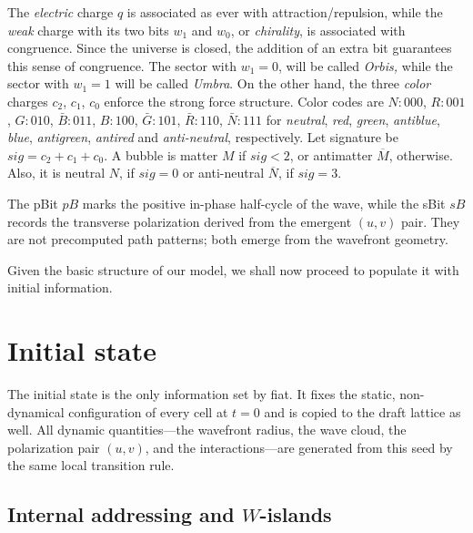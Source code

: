 \documentclass{ijuc}
\begin{document}
The \emph{electric} charge $q$ is associated as ever with attraction/repulsion, while the \emph{weak} charge with its two bits $w_{1}$ and $w_{0}$, or \emph{chirality}, is associated with congruence.
Since the universe is closed, the addition of an extra bit guarantees this sense of congruence. 
The sector with $w_{1}=0$, will be called \emph{Orbis, }while the sector with $w_{1}=1$ will be called \emph{Umbra}. 
On the other hand, the three \emph{color} charges $c_{2}$, $c_{1}$, $c_{0}$ enforce the strong force structure. 
Color codes are $N:000$, $R:001$, $G:010$, $\bar{B}:011$, $B:100$, $\bar{G}:101$, $\bar{R}:110$, $\bar{N}:111$ for \emph{neutral}, \emph{red}, \emph{green}, \emph{antiblue}, \emph{blue}, \emph{antigreen}, \emph{antired} and \emph{anti-neutral}, respectively.
Let signature be $sig=c_{2}+c_{1}+c_{0}$. 
A bubble is matter $M$ if $sig<2$, or antimatter $\overline{M}$, otherwise. 
Also, it is neutral $N$, if $sig=0$ or anti-neutral $\overline{N}$, if $sig=3$.

The pBit $pB$ marks the positive in-phase half-cycle of the wave, while the sBit $sB$ records the transverse polarization derived from the emergent $(u,v)$ pair.  They are not precomputed path patterns; both emerge from the wavefront geometry.

Given the basic structure of our model, we shall now proceed to populate it with initial information.


\section{Initial state}\label{initial-state}

The initial state is the only information set by fiat.  It fixes the static, non-dynamical configuration of every cell at $t=0$ and is copied to the draft lattice as well.  All dynamic quantities---the wavefront radius, the wave cloud, the polarization pair $(u,v)$, and the interactions---are generated from this seed by the same local transition rule.

\subsection{Internal addressing and $W$-islands}\label{subsec:w-islands}
\end{document}
